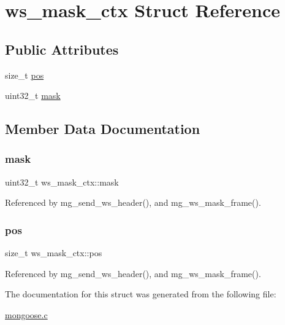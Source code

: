 \hypertarget{structws__mask__ctx}{}\section{ws\+\_\+mask\+\_\+ctx Struct Reference}
\label{structws__mask__ctx}
\subsection*{Public Attributes}
\begin{DoxyCompactItemize}
\item 
size\+\_\+t \hyperlink{structws__mask__ctx_a475d1d7c7e1ffef41e9ddd94c738dc93_a475d1d7c7e1ffef41e9ddd94c738dc93}{pos}
\item 
uint32\+\_\+t \hyperlink{structws__mask__ctx_a5d0e6527780100ef7cac724b7b7c43ca_a5d0e6527780100ef7cac724b7b7c43ca}{mask}
\end{DoxyCompactItemize}


\subsection{Member Data Documentation}
\mbox{\label{structws__mask__ctx_a5d0e6527780100ef7cac724b7b7c43ca_a5d0e6527780100ef7cac724b7b7c43ca}} 
\subsubsection{\texorpdfstring{mask}{mask}}
{\footnotesize\ttfamily uint32\+\_\+t ws\+\_\+mask\+\_\+ctx\+::mask}



Referenced by mg\+\_\+send\+\_\+ws\+\_\+header(), and mg\+\_\+ws\+\_\+mask\+\_\+frame().

\mbox{\label{structws__mask__ctx_a475d1d7c7e1ffef41e9ddd94c738dc93_a475d1d7c7e1ffef41e9ddd94c738dc93}} 
\subsubsection{\texorpdfstring{pos}{pos}}
{\footnotesize\ttfamily size\+\_\+t ws\+\_\+mask\+\_\+ctx\+::pos}



Referenced by mg\+\_\+send\+\_\+ws\+\_\+header(), and mg\+\_\+ws\+\_\+mask\+\_\+frame().



The documentation for this struct was generated from the following file\+:\begin{DoxyCompactItemize}
\item 
\hyperlink{mongoose_8c}{mongoose.\+c}\end{DoxyCompactItemize}
